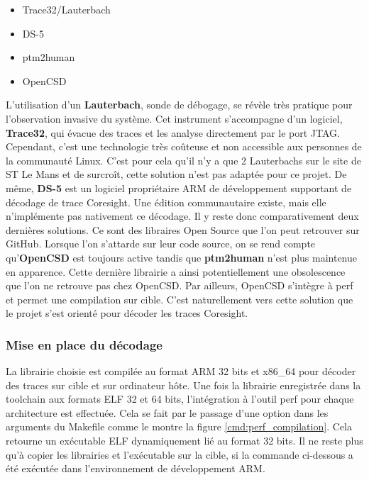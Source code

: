 \begin{itemize}[label=\textbullet]
    \item Trace32/Lauterbach
    \item DS-5
    \item ptm2human
    \item OpenCSD
\end{itemize}

L'utilisation d'un \textbf{Lauterbach}, sonde de débogage, se révèle très
pratique pour l'observation invasive du système. Cet instrument s'accompagne
d'un logiciel, \textbf{Trace32}, qui évacue des traces et les analyse
directement par le port JTAG. Cependant, c'est une technologie très coûteuse et
non accessible aux personnes de la communauté Linux. C'est pour cela qu'il n'y
a que 2 Lauterbachs sur le site de ST Le Mans et de surcroît, cette solution
n'est pas adaptée pour ce projet. De même, \textbf{DS-5} est un logiciel
propriétaire ARM de développement supportant de décodage de trace Coresight.
Une édition communautaire existe, mais elle n'implémente pas nativement ce
décodage. Il y reste donc comparativement deux dernières solutions. Ce
sont des libraires Open Source que l'on peut retrouver sur GitHub. Lorsque
l'on s'attarde sur leur code source, on se rend compte qu'\textbf{OpenCSD} est
toujours active tandis que \textbf{ptm2human} n'est plus maintenue en
apparence. Cette dernière librairie a ainsi potentiellement une obsolescence
que l'on ne retrouve pas chez OpenCSD.  Par ailleurs, OpenCSD s'intègre à
perf et permet une compilation sur cible.  C'est naturellement vers cette
solution que le projet s'est orienté pour décoder les traces Coresight.

\subsubsection{Mise en place du décodage}
\label{sec:proper_decoding}

La librairie choisie est compilée au format ARM 32 bits et x86\_64 pour
décoder des traces sur cible et sur ordinateur hôte. Une fois la librairie
enregistrée dans la toolchain aux formats ELF 32 et 64 bits, l'intégration à
l'outil perf pour chaque architecture est effectuée. Cela se fait par le
passage d'une option dans les arguments du Makefile comme le montre la figure
\ref{cmd:perf_compilation}. Cela retourne un exécutable ELF dynamiquement lié
au format 32 bits. Il ne reste plus qu'à copier les librairies et l'exécutable
sur la cible, si la commande ci-dessous a été exécutée dans l'environnement de
développement ARM. 


